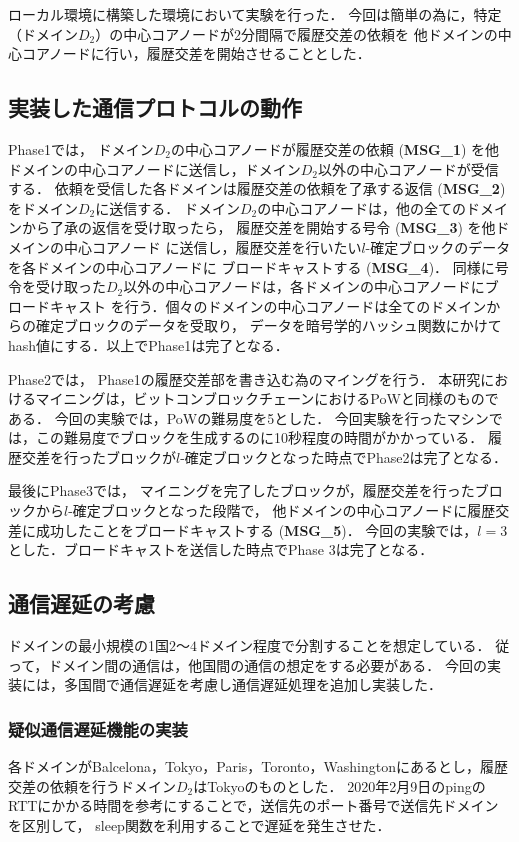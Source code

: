 \documentclass[a4paper,12pt]{jsarticle}
\begin{document}
ローカル環境に構築した環境において実験を行った．
今回は簡単の為に，特定（ドメイン$D_2$）の中心コアノードが2分間隔で履歴交差の依頼を
他ドメインの中心コアノードに行い，履歴交差を開始させることとした．

\subsection{実装した通信プロトコルの動作}
Phase1では，
ドメイン$D_2$の中心コアノードが履歴交差の依頼 (\textbf{MSG\_1})
を他ドメインの中心コアノードに送信し，ドメイン$D_2$以外の中心コアノードが受信する．
依頼を受信した各ドメインは履歴交差の依頼を了承する返信 (\textbf{MSG\_2})
をドメイン$D_2$に送信する．
ドメイン$D_2$の中心コアノードは，他の全てのドメインから了承の返信を受け取ったら，
履歴交差を開始する号令 (\textbf{MSG\_3}) を他ドメインの中心コアノード
に送信し，履歴交差を行いたい$l$-確定ブロックのデータを各ドメインの中心コアノードに
ブロードキャストする (\textbf{MSG\_4})．
同様に号令を受け取った$D_2$以外の中心コアノードは，各ドメインの中心コアノードにブロードキャスト
を行う．個々のドメインの中心コアノードは全てのドメインからの確定ブロックのデータを受取り，
データを暗号学的ハッシュ関数にかけてhash値にする．以上でPhase1は完了となる．

Phase2では，
Phase1の履歴交差部を書き込む為のマイングを行う．
本研究におけるマイニングは，ビットコンブロックチェーンにおけるPoWと同様のものである．
今回の実験では，PoWの難易度を5とした．
今回実験を行ったマシンでは，この難易度でブロックを生成するのに10秒程度の時間がかかっている．
履歴交差を行ったブロックが$l$-確定ブロックとなった時点でPhase2は完了となる．

最後にPhase3では，
マイニングを完了したブロックが，履歴交差を行ったブロックから$l$-確定ブロックとなった段階で，
他ドメインの中心コアノードに履歴交差に成功したことをブロードキャストする
 (\textbf{MSG\_5})．
今回の実験では，$l=3$とした．ブロードキャストを送信した時点でPhase 3は完了となる．

\subsection{通信遅延の考慮}
\label{crossref_p}
ドメインの最小規模の1国$2$〜$4$ドメイン程度で分割することを想定している．
従って，ドメイン間の通信は，他国間の通信の想定をする必要がある．
今回の実装には，多国間で通信遅延を考慮し通信遅延処理を追加し実装した．

\subsubsection{疑似通信遅延機能の実装}
各ドメインがBalcelona，Tokyo，Paris，Toronto，Washingtonにあるとし，履歴交差の依頼を行うドメイン$D_2$はTokyoのものとした．
2020年2月9日のpingのRTTにかかる時間\cite{pings}を参考にすることで，送信先のポート番号で送信先ドメインを区別して，
sleep関数を利用することで遅延を発生させた．
\end{document}
